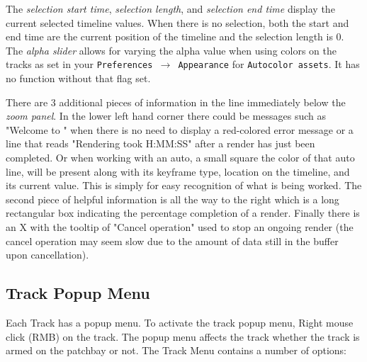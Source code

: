 The \emph{selection start time}, \emph{selection length}, and \emph{selection end time} display the current selected timeline values. When there is no selection, both the start and end time are the current
position of the timeline and the selection length is 0.
The \emph{alpha slider} allows for varying the alpha value when using colors on the tracks as set in your \texttt{Preferences $\rightarrow$ Appearance} for \texttt{Autocolor assets}.  
It has no function without that flag set.

There are 3 additional pieces of information in the line immediately below the \textit{zoom panel}.
In the lower left hand corner there could be messages such as "Welcome to \CGG{}" when there is no 
need to display a red-colored error message or a line that reads "Rendering took H:MM:SS" after a render
has just been completed. Or when working with an auto, a small square the color of that auto line, will be
present along with its keyframe type, location on the timeline, and its current value.  This is simply
for easy recognition of what is being worked. The second piece of helpful information is all the way to
the right which is a long rectangular box indicating the percentage completion of a render. Finally
there is an X with the tooltip of "Cancel operation" used to stop an ongoing render
(the cancel operation may seem slow due to the amount of data still in the buffer upon cancellation).

\subsection{Track Popup Menu}%
\label{sub:track_popup_menu}

Each Track has a popup menu. 
To activate the track popup menu, Right mouse click (RMB) on the track. 
The popup menu affects the track whether the track is armed on the patchbay or not. 
The Track Menu contains a number of options:

